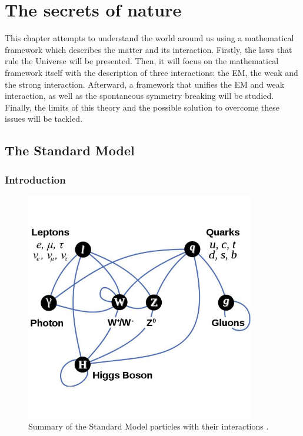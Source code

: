 \chapter{The secrets of nature}
\label{chap:SM}

  This chapter attempts to understand the world around us using a mathematical framework which describes the matter and its interaction.
  Firstly, the laws that rule the Universe will be presented.
  Then, it will focus on the mathematical framework itself with the description of three interactions: the \gls{EM}, the weak and the strong interaction.
  Afterward, a framework that unifies the \gls{EM} and weak interaction, as well as the spontaneous symmetry breaking will be studied.
  Finally, the limits of this theory and the possible solution to overcome these issues will be tackled.
 
  \minitoc
  
  \section{The Standard Model}

    \subsection{Introduction}
     
    \begin{figure}[!h]
    \centering
      \includegraphics[width = 10cm]{Pictures/SM/elementaryParticles.jpg}
    \caption{Summary of the Standard Model particles with their interactions \cite{SM}.}
    \label{fig:partInterac}
    \end{figure}   
    

